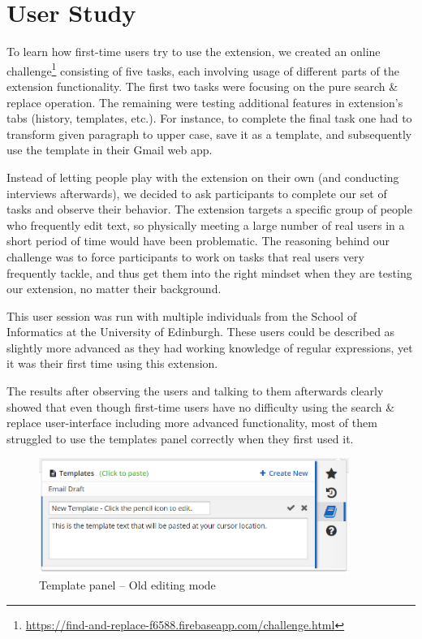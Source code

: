 \documentclass[bsc,frontabs,twoside,singlespacing,parskip,deptreport]{infthesis}
\begin{document}
\section{User Study}
To learn how first-time users try to use the extension, we created an online challenge\footnote{\url{https://find-and-replace-f6588.firebaseapp.com/challenge.html}} consisting of five tasks, each involving usage of different parts of the extension functionality. The first two tasks were focusing on the pure search \& replace operation. The remaining were testing additional features in extension's tabs (history, templates, etc.). For instance, to complete the final task one had to transform given paragraph to upper case, save it as a template, and subsequently use the template in their Gmail web app.

Instead of letting people play with the extension on their own (and conducting interviews afterwards), we decided to ask participants to complete our set of tasks and observe their behavior. The extension targets a specific group of people who frequently edit text, so physically meeting a large number of real users in a short period of time would have been problematic. The reasoning behind our challenge was to force participants to work on tasks that real users very frequently tackle, and thus get them into the right mindset when they are testing our extension, no matter their background.

This user session was run with multiple individuals from the School of Informatics at the University of Edinburgh. These users could be described as slightly more advanced as they had working knowledge of regular expressions, yet it was their first time using this extension.

The results after observing the users and talking to them afterwards clearly showed that even though first-time users have no difficulty using the search \& replace user-interface including more advanced functionality, most of them struggled to use the templates panel correctly when they first used it. 

\begin{figure}[h]
\centering
\includegraphics[width=0.9\textwidth]{../docs/template-edit-mode-old.png}
\caption{Template panel -- Old editing mode}
\end{figure}
\end{document}
